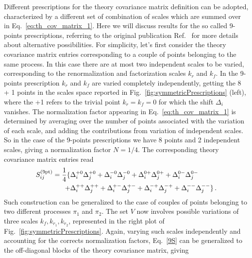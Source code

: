 %
Different prescriptions for the theory covariance matrix definition can be adopted, characterized by a different
set of combination of scales which are summed over in Eq.~\ref{eq:th_cov_matrix_1}.
Here we will discuss results for the so called 9-points prescriptions, referring to the original publication 
Ref.~\cite{AbdulKhalek:2020jut} for more details about alternative possibilities.
For simplicity, let's first consider the theory covariance matrix entries corresponding to 
a couple of points belonging to the same process. In this case there are at most two independent scales to be varied,
corresponding to the renormalization and factorization scales $k_r$ and $k_f$.
In the 9-points prescription $k_r$ and $k_f$ are varied completely independently, getting the 8 + 1 points in the 
scales space reported in Fig.~\ref{fig:symmetricPrescriptions} (left), where the +1 refers to the trivial 
point $k_r=k_f=0$ for which the shift $\Delta_i$ vanishes.
The normalization factor appearing in Eq.~\ref{eq:th_cov_matrix_1}
is determined by averaging over the number of points associated with the variation of each scale,
and adding the contributions from variation of independent scales.
So in the case of the 9-points prescriptions we have 8 points and 2 independent scales, 
giving a normalization factor $N=1/4$. The corresponding theory covariance matrix entries read
\begin{equation}
    \label{9S}
    \begin{split}
        S^{(\rm 9pt)}_{ij} = \frac{1}{4}\{ &\Delta_i^{+0} \Delta_j^{+0} + \Delta_i^{-0}\Delta_j^{-0}
                                + \Delta_i^{0+} \Delta_j^{0+} + \Delta_i^{0-}\Delta_j^{0-} \\
                                + &\Delta_i^{++}\Delta_j^{++} + \Delta_i^{+-} \Delta_j^{+-}
                                + \Delta_i^{-+}\Delta_j^{-+} + \Delta_i^{--} \Delta_j^{--} \} \, .
    \end{split}                            
\end{equation}
Such construction can be generalized to the case of couples of
points belonging to two different processes $\pi_1$ and $\pi_2$. The set $V$ now involves 
possible variations of three scales $k_f,k_{r_1}, k_{r_2}$, represented in the right plot 
of Fig.~\ref{fig:symmetricPrescriptions}.
Again, varying such scales independently and accounting for the corrects normalization factors,
Eq.~\ref{9S} can be generalized to the off-diagonal blocks of the theory covariance matrix, giving
